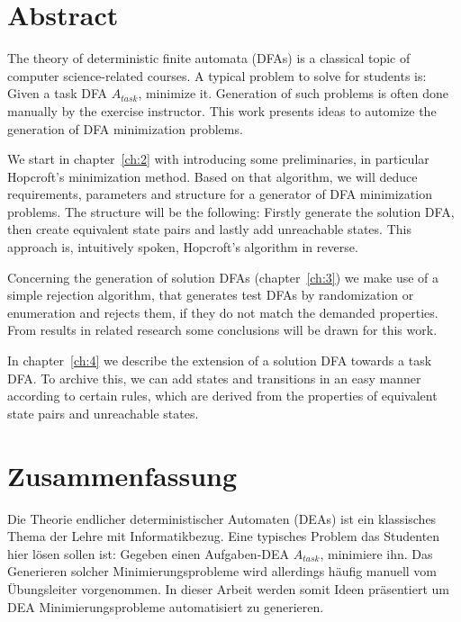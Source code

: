 
\chapter{Abstract}


The theory of deterministic finite automata (DFAs) is a classical topic of computer science-related courses. A typical problem to solve for students is: Given a task DFA $A_{task}$, minimize it. Generation of such problems is often done manually by the exercise instructor. This work presents ideas to automize the generation of DFA minimization problems.


We start in chapter~\ref{ch:2} with introducing some preliminaries, in particular Hopcroft's minimization method. Based on that algorithm, we will deduce requirements, parameters and structure for a generator of DFA minimization problems. The structure will be the following: Firstly generate the solution DFA, then create equivalent state pairs and lastly add unreachable states. This approach is, intuitively spoken, Hopcroft's algorithm in reverse.


Concerning the generation of solution DFAs (chapter~\ref{ch:3}) we make use of a simple rejection algorithm, that generates test DFAs by randomization or enumeration and rejects them, if they do not match the demanded properties. From results in related research some conclusions will be drawn for this work.


In chapter~\ref{ch:4} we describe the extension of a solution DFA towards a task DFA. To archive this, we can add states and transitions in an easy manner according to certain rules, which are derived from the properties of equivalent state pairs and unreachable states. 



\chapter{Zusammenfassung}

Die Theorie endlicher deterministischer Automaten (DEAs) ist ein klassisches Thema der Lehre mit Informatikbezug. Eine typisches Problem das Studenten hier lösen sollen ist: Gegeben einen Aufgaben-DEA $A_{task}$, minimiere ihn. Das Generieren solcher Minimierungsprobleme wird allerdings häufig manuell vom Übungsleiter vorgenommen. In dieser Arbeit werden somit Ideen präsentiert um DEA Minimierungsprobleme automatisiert zu generieren.

